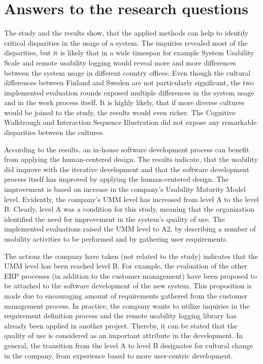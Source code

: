 \documentclass[12pt,a4paper,oneside,pdftex]{report}
\begin{document}
\section{Answers to the research questions}

The study and the results show, that the applied methods can help to identify critical disparities in the usage of a system. The inquiries revealed most of the disparities, but it is likely that in a wide timespan for example System Usability Scale and remote usability logging would reveal more and more differences between the system usage in different country offices. Even though the cultural differences between Finland and Sweden are not particularly significant, the two implemented evaluation rounds exposed multiple differences in the system usage and in the work process itself. It is highly likely, that if more diverse cultures would be joined to the study, the results would even richer. The Cognitive Walktrough and Interaction Sequence Illustration did not expose any remarkable disparities between the cultures. 

According to the results, an in-house software development process can benefit from applying the human-centered design. The results indicate, that the usability did improve with the iterative development and that the software development process itself has improved by applying the human-centered design. The improvement is based on increase in the company's Usability Maturity Model level. Evidently, the company's UMM level has increased from level A to the level B. Clearly, level A was a condition for this study, meaning that the organization identified the need for improvement in the system's quality of use. The implemented evaluations raised the UMM level to A2, by describing a number of usability activities to be performed and by gathering user requirements. 

The actions the company have taken (not related to the study) indicates that the UMM level has been reached level B. For example, the evaluation of the other ERP processes (in addition to the customer management) have been proposed to be attached to the software development of the new system. This proposition is made due to encouraging amount of requirements gathered from the customer management process. In practice, the company wants to utilize inquiries in the requirement definition process and the remote usability logging library has already been applied in another project. Thereby, it can be stated that the quality of use is considered as an important attribute in the development. In general, the transition from the level A to level B designates for cultural change in the company, from experience based to more user-centric development. 
\end{document}
